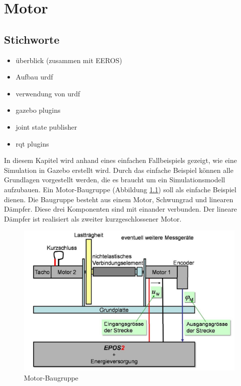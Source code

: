 \chapter{Motor}

\section*{Stichworte}
\begin{itemize}
\item überblick (zusammen mit EEROS)
\item Aufbau urdf
\item verwendung von urdf
\item gazebo plugins
\item joint state publisher
\item rqt plugins
\end{itemize}

In diesem Kapitel wird anhand eines einfachen Fallbeispiels gezeigt, wie eine Simulation in Gazebo erstellt wird.
Durch das einfache Beispiel können alle Grundlagen vorgestellt werden, die es braucht um ein Simulationsmodell aufzubauen.
Ein Motor-Baugruppe (Abbildung \ref{Ab:motor-baugruppe}) soll als einfache Beispiel dienen.
Die Baugruppe besteht aus einem Motor, Schwungrad und linearen Dämpfer.
Diese drei Komponenten sind mit einander verbunden.
Der lineare Dämpfer ist realisiert als zweiter kurzgeschlossener Motor.

\begin{figure}[ht!]
\centering
\includegraphics[width=14.5cm]{images/motor_baugruppe.png} %
\caption{Motor-Baugruppe}
\label{Ab:motor-baugruppe}
\end{figure}

